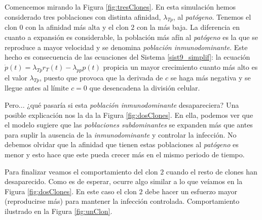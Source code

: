 Comencemos mirando la Figura \ref{fig:tresClones}. En esta simulación hemos considerado tres poblaciones con distinta afinidad, $\lambda_{Tp}$, al \textit{patógeno}. Tenemos el clon $0$ con la afinidad más alta y el clon $2$ con la más baja. La diferencia en cuanto a expansión es considerable, la población más afín al \textit{patógeno} es la que se reproduce a mayor velocidad y se denomina \textit{población inmunodominante}. Este hecho es consecuencia de las ecuaciones del Sistema \ref{sist9_simplif}: la ecuación $\dot{p}(t) = \lambda_{Tp}r_{T}(t) - \lambda_{pp}p(t)$ propicia un mayor crecimiento cuanto más alto es el valor $\lambda_{Tp}$, puesto que provoca que la derivada de $c$ se haga más negativa y se llegue antes al límite $c = 0$ que desencadena la división celular.



Pero... ¿qué pasaría si esta \textit{población inmunodominante} desapareciera? Una posible explicación nos la da la Figura \ref{fig:dosClones}. En ella, podemos ver que el modelo sugiere que las \textit{poblaciones subdominantes} se expanden más que antes para suplir la ausencia de la \textit{inmunodominante} y controlar la infección. No debemos olvidar que la afinidad que tienen estas poblaciones al \textit{patógeno} es menor y esto hace que este pueda crecer más en el mismo periodo de tiempo.



Para finalizar veamos el comportamiento del clon $2$ cuando el resto de clones han desaparecido. Como es de esperar, ocurre algo similar a lo que veíamos en la Figura \ref{fig:dosClones}. En este caso el clon $2$ debe hacer un esfuerzo mayor (reproducirse más) para mantener la infección controlada. Comportamiento ilustrado en la Figura \ref{fig:unClon}.

